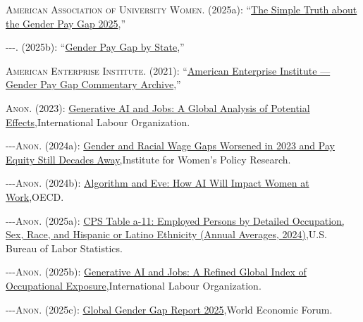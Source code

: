 \documentclass[
  letterpaper,
  DIV=11,
  numbers=noendperiod]{scrartcl}
\newlength{\cslhangindent}
\newenvironment{CSLReferences}[2] %
 {\begin{list}{}{%
  \setlength{\itemindent}{0pt}
  \setlength{\leftmargin}{0pt}
  \setlength{\parsep}{0pt}
  \ifodd #1
   \setlength{\leftmargin}{\cslhangindent}
   \setlength{\itemindent}{-1\cslhangindent}
  \fi
  \setlength{\itemsep}{#2\baselineskip}}}
 {\end{list}}
\begin{document}
\label{refs}
\begin{CSLReferences}{1}{1}
\textsc{American Association of University Women}. (2025a):
{``\href{https://www.aauw.org/resources/research/simple-truth/}{The
Simple Truth about the Gender Pay Gap 2025},''}

\textsc{-\/-\/-}. (2025b):
{``\href{https://www.aauw.org/resources/article/gender-pay-gap-by-state/}{Gender
Pay Gap by State},''}

\textsc{American Enterprise Institute}. (2021):
{``\href{https://www.aei.org/}{American Enterprise Institute --- Gender
Pay Gap Commentary Archive},''}

\textsc{Anon.} (2023):
\href{https://www.ilo.org/sites/default/files/wcmsp5/groups/public/\%40dgreports/\%40inst/documents/publication/wcms_890761.pdf}{Generative
AI and Jobs: A Global Analysis of Potential Effects},International
Labour Organization.

\textsc{-\/-\/-Anon.} (2024a):
\href{https://iwpr.org/wp-content/uploads/2024/09/IWPR-National-Wage-Gap-Fact-Sheet-2024.pdf}{Gender
and Racial Wage Gaps Worsened in 2023 and Pay Equity Still Decades
Away},Institute for Women's Policy Research.

\textsc{-\/-\/-Anon.} (2024b):
\href{https://www.oecd.org/content/dam/oecd/en/publications/reports/2024/12/algorithm-and-eve_0e889c45/a1603510-en.pdf}{Algorithm
and Eve: How AI Will Impact Women at Work},OECD.

\textsc{-\/-\/-Anon.} (2025a):
\href{https://www.bls.gov/cps/cpsaat11.htm}{CPS Table a-11: Employed
Persons by Detailed Occupation, Sex, Race, and Hispanic or Latino
Ethnicity (Annual Averages, 2024)},U.S. Bureau of Labor Statistics.

\textsc{-\/-\/-Anon.} (2025b):
\href{https://www.ilo.org/publications/generative-ai-and-jobs-refined-global-index-occupational-exposure}{Generative
AI and Jobs: A Refined Global Index of Occupational
Exposure},International Labour Organization.

\textsc{-\/-\/-Anon.} (2025c):
\href{https://reports.weforum.org/docs/WEF_GGGR_2025.pdf}{Global Gender
Gap Report 2025},World Economic Forum.


\end{CSLReferences}
\end{document}
